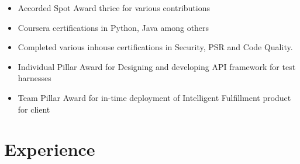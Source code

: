 \documentclass[letterpaper]{twentysecondcv} %
\begin{document}
\begin{itemize}[leftmargin=*]
	
	\item Accorded Spot Award thrice for various contributions
	\item Coursera certifications in Python, Java among others
	\item Completed various inhouse certifications in Security, PSR and Code Quality.
	\item Individual Pillar Award for Designing and developing API framework for test harnesses
	\item Team Pillar Award for in-time deployment of Intelligent Fulfillment product for client

\end{itemize}



\newpage %

\makesecondpageprofile %


\section{Experience}
\end{document}
